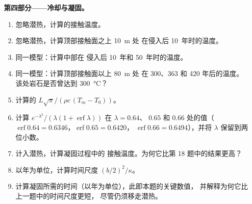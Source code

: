 \begin{problem}
\noindent\textbf{第四部分——冷却与凝固。}
\begin{enumerate}[resume]
\item 忽略潜热，计算的接触温度。
\item 忽略潜热，计算顶部接触面之上 \qty{10}{m} 处
在侵入后 \num{10}~年时的温度。
\item 同一模型：计算中部在
侵入后 \num{10}~年和 \num{50}~年时的温度。
\item 同一模型：计算顶部接触面以上 \qty{80}{m} 处
在 \num{300}、\num{363} 和 \num{420} 年后的温度。
该处岩石是否曾达到 \qty{300}{\celsius}？
\item 计算的 $L\sqrt\pi/(\rho c\,(T_m - T_0))$。
\item 计算 $e^{-\lambda^2}/(\lambda(1 + \operatorname{erf}\lambda))$ 在 $\lambda = 0.64$、
$0.65$ 和 $0.66$ 处的值（$\operatorname{erf}0.64 = 0.6346$，$\operatorname{erf}0.65 = 0.6420$，
$\operatorname{erf}0.66 = 0.6494$），并将 $\lambda$ 保留到两位小数。
\item 计入潜热，计算凝固过程中的
接触温度。为何它比第 18 题中的结果更高？
\item 以年为单位，计算时间尺度 $(b/2)^2/\kappa$。
\item 计算凝固所需的时间（以年为单位），此即本题的关键数值，
并解释为何它比上一题中的时间尺度更短，
尽管仍须移走潜热。
\end{enumerate}
\end{problem}
